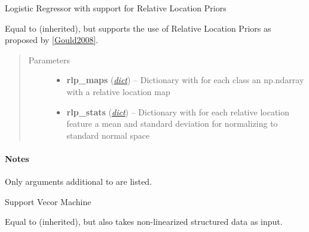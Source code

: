 \documentclass[letterpaper,10pt,english]{sphinxmanual}
\begin{document}
\begin{fulllineitems}
\label{classification:flamingo.classification.models.LogisticRegressionRLP}
Logistic Regressor with support for Relative Location Priors

Equal to {\hyperref[classification:flamingo.classification.models.LogisticRegression]{}}
(inherited), but supports the use of Relative Location Priors as
proposed by {\hyperref[classification:gould2008]{{[}Gould2008{]}}}.
\begin{quote}\begin{description}
\item[{Parameters}] \leavevmode\begin{itemize}
\item {} 
\textbf{rlp\_maps} (\href{http://docs.python.org/library/stdtypes.html\#dict}{\emph{dict}}) -- Dictionary with for each class an np.ndarray with a relative
location map

\item {} 
\textbf{rlp\_stats} (\href{http://docs.python.org/library/stdtypes.html\#dict}{\emph{dict}}) -- Dictionary with for each relative location feature a mean and
standard deviation for normalizing to standard normal space

\end{itemize}

\end{description}\end{quote}
\paragraph{Notes}

Only arguments additional to {\hyperref[classification:flamingo.classification.models.LogisticRegression]{}} are listed.

\end{fulllineitems}


\begin{fulllineitems}
\label{classification:flamingo.classification.models.SupportVectorMachine}
Support Vecor Machine

Equal to  (inherited), but also
takes non-linearized structured data as input.

\end{fulllineitems}
\end{document}
